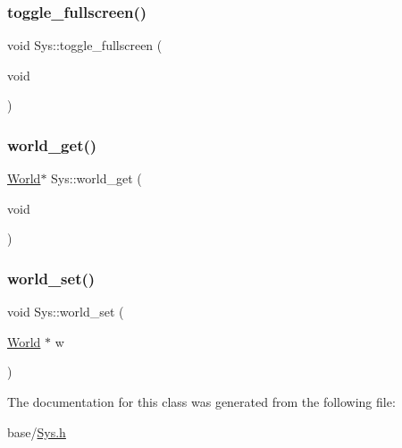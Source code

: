 \mbox{\label{classSys_a2b0db92b30d906bea2600fc10b41de6c}} 
\subsubsection{\texorpdfstring{toggle\+\_\+fullscreen()}{toggle\_fullscreen()}}
{\footnotesize\ttfamily void Sys\+::toggle\+\_\+fullscreen (\begin{DoxyParamCaption}\item[{void}]{ }\end{DoxyParamCaption})}

\mbox{\label{classSys_aee0559155f152be16fd2b42fe13635f0}} 
\subsubsection{\texorpdfstring{world\+\_\+get()}{world\_get()}}
{\footnotesize\ttfamily \mbox{\hyperlink{classWorld}{World}}$\ast$ Sys\+::world\+\_\+get (\begin{DoxyParamCaption}\item[{void}]{ }\end{DoxyParamCaption})}

\mbox{\label{classSys_ad3ee3df03087abf9cc5d15a57e0ab0a2}} 
\subsubsection{\texorpdfstring{world\+\_\+set()}{world\_set()}}
{\footnotesize\ttfamily void Sys\+::world\+\_\+set (\begin{DoxyParamCaption}\item[{\mbox{\hyperlink{classWorld}{World}} $\ast$}]{w }\end{DoxyParamCaption})}



The documentation for this class was generated from the following file\+:\begin{DoxyCompactItemize}
\item 
base/\mbox{\hyperlink{Sys_8h}{Sys.\+h}}\end{DoxyCompactItemize}
